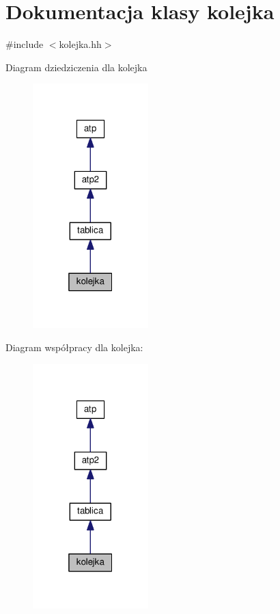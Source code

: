 \hypertarget{classkolejka}{}\section{Dokumentacja klasy kolejka}
\label{classkolejka}


{\ttfamily \#include $<$kolejka.\+hh$>$}



Diagram dziedziczenia dla kolejka\nopagebreak
\begin{figure}[H]
\begin{center}
\leavevmode
\includegraphics[width=127pt]{classkolejka__inherit__graph}
\end{center}
\end{figure}


Diagram współpracy dla kolejka\+:\nopagebreak
\begin{figure}[H]
\begin{center}
\leavevmode
\includegraphics[width=127pt]{classkolejka__coll__graph}
\end{center}
\end{figure}
